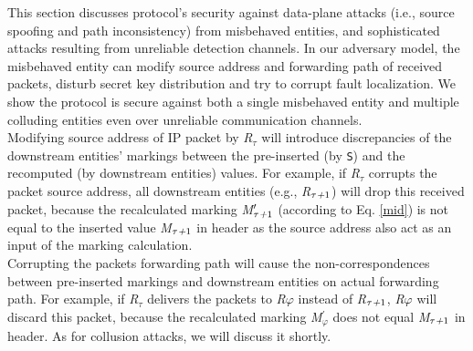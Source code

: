 This section discusses \name{} protocol's security against data-plane attacks (i.e., source spoofing and path inconsistency) from misbehaved entities, and sophisticated attacks resulting from unreliable detection channels. In our adversary model, the misbehaved entity can modify source address and forwarding path of received packets, disturb secret key distribution and try to corrupt fault localization. We show the \name{} protocol is secure against both a single misbehaved entity and multiple colluding entities even over unreliable communication channels.\\
 Modifying source address of IP packet by \emph{R}$_\tau$ will introduce discrepancies of the downstream entities' markings between the pre-inserted (by {\tt S}) and the recomputed (by downstream entities) values. For example, if \emph{R}$_\tau$ corrupts the packet source address, all downstream entities (e.g., \emph{R}$_{\tau\emph{+}1}$) will drop this received packet, because the recalculated marking \emph{M}$_{\tau\emph{+}1}^\prime$ (according to Eq. \ref{mid}) is not equal to the inserted value \emph{M}$_{\tau\emph{+}1}$ in \name{} header as the source address also act as an input of the marking calculation.\\
 Corrupting the packets forwarding path will cause the non-correspondences between pre-inserted markings and downstream entities on actual forwarding path. For example, if \emph{R}$_\tau$ delivers the packets to \emph{R}$\varphi$ instead of \emph{R}$_{\tau\emph{+}1}$, \emph{R}$\varphi$ will discard this packet, because the recalculated marking \emph{M}$_\varphi^\prime$ does not equal \emph{M}$_{\tau\emph{+}1}$ in \name{} header. As for collusion attacks, we will discuss it shortly.\\
